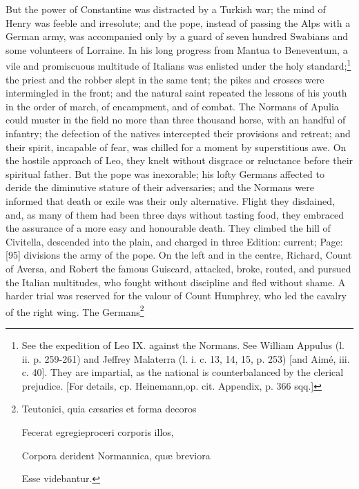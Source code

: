 But the power of Constantine was distracted by a Turkish war; the mind of Henry was feeble and irresolute; and the pope, instead of passing the Alps with a German army, was accompanied only by a guard of seven hundred Swabians and some volunteers of Lorraine. In his long progress from Mantua to Beneventum, a vile and promiscuous multitude of Italians was enlisted under the holy standard;\footnote{See the expedition of Leo IX. against the Normans. See William Appulus (l. ii. p. 259-261) and Jeffrey Malaterra (l. i. c. 13, 14, 15, p. 253) [and Aimé, iii. c. 40]. They are impartial, as the national is counterbalanced by the clerical prejudice. [For details, cp. Heinemann,op. cit. Appendix, p. 366 sqq.]} the priest and the robber slept in the same tent; the pikes and crosses were intermingled in the front; and the natural saint repeated the lessons of his youth in the order of march, of encampment, and of combat. The Normans of Apulia could muster in the field no more than three thousand horse, with an handful of infantry; the defection of the natives intercepted their provisions and retreat; and their spirit, incapable of fear, was chilled for a moment by superstitious awe. On the hostile approach of Leo, they knelt without disgrace or reluctance before their spiritual father. But the pope was inexorable; his lofty Germans affected to deride the diminutive stature of their adversaries; and the Normans were informed that death or exile was their only alternative. Flight they disdained, and, as many of them had been three days without tasting food, they embraced the assurance of a more easy and honourable death. They climbed the hill of Civitella, descended into the plain, and charged in three Edition: current; Page: [95] divisions the army of the pope. On the left and in the centre, Richard, Count of Aversa, and Robert the famous Guiscard, attacked, broke, routed, and pursued the Italian multitudes, who fought without discipline and fled without shame. A harder trial was reserved for the valour of Count Humphrey, who led the cavalry of the right wing. The Germans\footnote{Teutonici, quia cæsaries et forma decoros

Fecerat egregieproceri corporis illos,

Corpora derident Normannica, quæ breviora

Esse videbantur.

}

